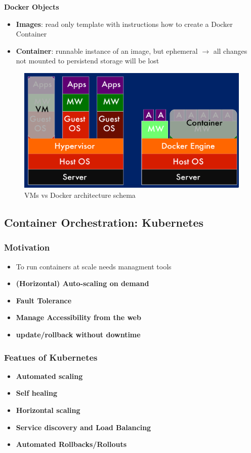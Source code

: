 \documentclass[a4paper]{article}
\begin{document}
\begin{multicols}{3}
\textbf{Docker Objects}
\begin{itemize}
    \item \textbf{Images}: read only template with instructions how to create a Docker Container
    \item \textbf{Container}: runnable instance of an  image, but ephemeral $\rightarrow$ all changes not mounted to persistend storage will be lost
\end{itemize}

\begin{figure}[H]
    \includegraphics[width=\linewidth]{vmvsdocker.png}
    \caption{VMs vs Docker architecture schema}
    \label{fig:vmvsdocker}
\end{figure}

\subsection{Container Orchestration: Kubernetes}

\subsubsection{Motivation}
\begin{itemize}
    \item To run containers at scale needs managment tools
    \item \textbf{(Horizontal) Auto-scaling on demand}
    \item \textbf{Fault Tolerance}
    \item \textbf{Manage Accessibility from the web}
    \item \textbf{update/rollback without downtime}
\end{itemize}

\subsubsection{Featues of Kubernetes}
\begin{itemize}
    \item \textbf{Automated scaling}
    \item \textbf{Self healing}
    \item \textbf{Horizontal scaling}
    \item \textbf{Service discovery and Load Balancing}
    \item \textbf{Automated Rollbacks/Rollouts}
\end{itemize}


\end{multicols}
\end{document}
